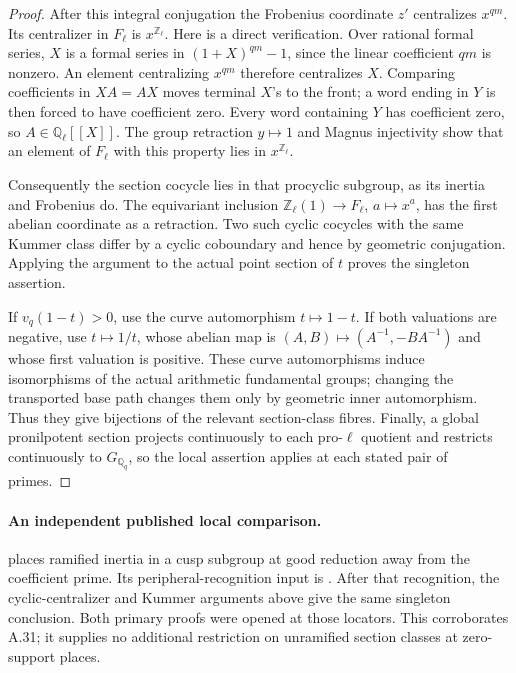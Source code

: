 \begin{proof}
After this integral conjugation the Frobenius coordinate $z'$
centralizes $x^{qm}$. Its centralizer in $F_\ell$ is
$x^{\mathbb Z_\ell}$. Here is a direct verification. Over rational
formal series, $X$ is a formal series in $(1+X)^{qm}-1$, since the
linear coefficient $qm$ is nonzero. An element centralizing
$x^{qm}$ therefore centralizes $X$. Comparing coefficients in
$XA=AX$ moves terminal $X$'s to the front; a word ending in $Y$
is then forced to have coefficient zero. Every word containing $Y$
has coefficient zero, so $A\in\mathbb Q_\ell[[X]]$. The group
retraction $y\mapsto1$ and Magnus injectivity show that an element
of $F_\ell$ with this property lies in $x^{\mathbb Z_\ell}$.

Consequently the section cocycle lies in that procyclic subgroup,
as its inertia and Frobenius do. The equivariant inclusion
$\mathbb Z_\ell(1)\to F_\ell$, $a\mapsto x^a$, has the first
abelian coordinate as a retraction. Two such cyclic cocycles with
the same Kummer class differ by a cyclic coboundary and hence by
geometric conjugation. Applying the argument to the actual point
section of $t$ proves the singleton assertion.

If $v_q(1-t)>0$, use the curve automorphism $t\mapsto1-t$.
If both valuations are negative, use $t\mapsto1/t$, whose abelian
map is $(A,B)\mapsto(A^{-1},-BA^{-1})$ and whose first valuation
is positive. These curve automorphisms induce isomorphisms of the
actual arithmetic fundamental groups; changing the transported base
path changes them only by geometric inner automorphism. Thus they
give bijections of the relevant section-class fibres. Finally, a
global pronilpotent section projects continuously to each pro-$\ell$
quotient and restricts continuously to $G_{\mathbb Q_q}$, so the
local assertion applies at each stated pair of primes.
\end{proof}

\paragraph{An independent published local comparison.}
\citet[Proposition~A.6, author pp.~37--38]{RootHoshi2014Conditional}
places ramified inertia in a cusp subgroup at good reduction away
from the coefficient prime. Its peripheral-recognition input is
\citet[Lemma~1.6, author pp.~15--16]{RootHoshiMochizuki2011}.
After that recognition, the cyclic-centralizer and Kummer arguments
above give the same singleton conclusion. Both primary proofs were
opened at those locators. This corroborates A.31; it supplies no
additional restriction on unramified section classes at zero-support
places.

